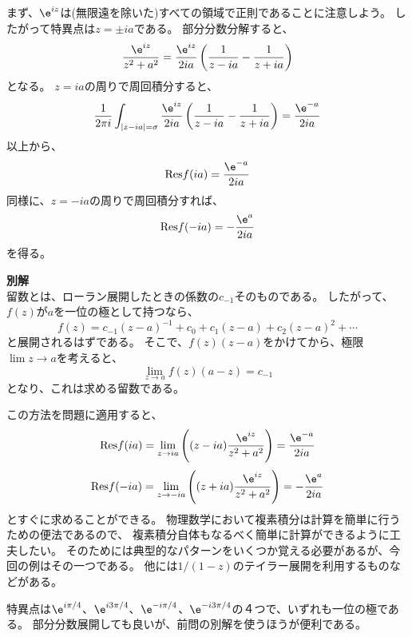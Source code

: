 まず、$\e^{iz}$は(無限遠を除いた)すべての領域で正則であることに注意しよう。
したがって特異点は$z = \pm i a$である。
部分分数分解すると、
\begin{equation}
  \frac{\e^{iz}}{z^2+a^2} = \frac{\e^{iz}}{2ia}
  \left(
  \frac{1}{z-ia} - \frac{1}{z+ia}
  \right)
\end{equation}
となる。
$z=ia$の周りで周回積分すると、
\begin{equation}
  \frac{1}{2\pi i} \int_{|z-ia|=\sigma} \frac{\e^{iz}}{2ia}
  \left(
  \frac{1}{z-ia} - \frac{1}{z+ia}
  \right)
  = \frac{\e^{-a}}{2ia}
\end{equation}
以上から、
\begin{equation}
  \mbox{Res} f(ia) = \frac{\e^{-a}}{2ia}
\end{equation}
同様に、$z=-ia$の周りで周回積分すれば、
\begin{equation}
  \mbox{Res} f(-ia) = - \frac{\e^{a}}{2ia}
\end{equation}
を得る。

{\bf 別解}\\
留数とは、ローラン展開したときの係数の$c_{-1}$そのものである。
したがって、$f(z)$が$a$を一位の極として持つなら、
\begin{equation}
  f(z) = c_{-1} (z-a)^{-1} + c_0 + c_1 (z-a) + c_2 (z-a)^2 + \cdots
\end{equation}
と展開されるはずである。
そこで、$f(z)(z-a)$をかけてから、極限$\lim z \rightarrow a$を考えると、
\begin{equation}
  \lim_{z \rightarrow a} f(z)(a-z) = c_{-1}
\end{equation}
となり、これは求める留数である。

この方法を問題に適用すると、
\begin{equation}
  \mbox{Res} f(ia) = \lim_{z \rightarrow ia} \left( (z-ia) \frac{\e^{iz}}{z^2+a^2} \right)
  = \frac{\e^{-a}}{2ia}
\end{equation}
\begin{equation}
  \mbox{Res} f(-ia) = \lim_{z \rightarrow -ia} \left( (z+ia) \frac{\e^{iz}}{z^2+a^2} \right)
  = -\frac{\e^{a}}{2ia}
\end{equation}
とすぐに求めることができる。
物理数学において複素積分は計算を簡単に行うための便法であるので、
複素積分自体もなるべく簡単に計算ができるように工夫したい。
そのためには典型的なパターンをいくつか覚える必要があるが、今回の例はその一つである。
他には$1/(1-z)$のテイラー展開を利用するものなどがある。

特異点は$\e^{i \pi /4}$、$\e^{i 3\pi /4}$、$\e^{-i \pi /4}$、$\e^{-i 3\pi /4}$の４つで、いずれも一位の極である。
部分分数展開しても良いが、前問の別解を使うほうが便利である。

